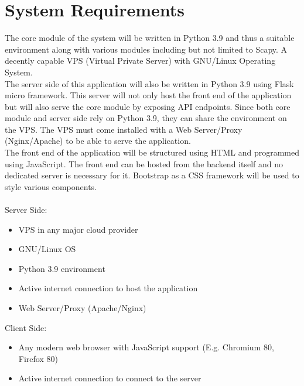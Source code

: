 \chapter{System Requirements}
\fontsize{12}{0}
{
	The core module of the system will be written in Python 3.9 and thus a suitable environment along with various modules including but not limited to Scapy. A decently capable VPS (Virtual Private Server) with GNU/Linux Operating System. \\
	The server side of this application will also be written in Python 3.9 using Flask micro framework. This server will not only host the front end of the application but will also serve the core module by exposing API endpoints. Since both core module and server side rely on Python 3.9, they can share the environment on the VPS. The VPS must come installed with a Web Server/Proxy (Nginx/Apache) to be able to serve the application. \\
	The front end of the application will be structured using HTML and programmed using JavaScript. The front end can be hosted from the backend itself and no dedicated server is necessary for it. Bootstrap as a CSS framework will be used to style various components. \\ \ \\
	Server Side:
	\begin{itemize}
		\item {VPS in any major cloud provider}
		\item {GNU/Linux OS}
		\item {Python 3.9 environment}
		\item {Active internet connection to host the application}
		\item {Web Server/Proxy (Apache/Nginx)}
	\end{itemize} 
	Client Side:
	\begin{itemize}
		\item {Any modern web browser with JavaScript support (E.g. Chromium 80, Firefox 80)}
		\item {Active internet connection to connect to the server}
	\end{itemize}
}